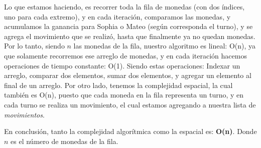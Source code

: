 Lo que estamos haciendo, es recorrer toda la fila de monedas (con dos índices, uno para cada extremo), y en cada iteración, comparamos las monedas, y acumulamos la ganancia para Sophia o Mateo (según corresponda el turno), y se agrega el movimiento que se realizó, hasta que finalmente ya no quedan monedas. Por lo tanto, siendo $n$ las monedas de la fila, nuestro algoritmo es lineal: O(n), ya que solamente recorremos ese arreglo de monedas, y en cada iteración hacemos operaciones de tiempo constante: O(1). Siendo estas operaciones: Indexar un arreglo, comparar dos elementos, sumar dos elementos, y agregar un elemento al final de un arreglo. Por otro lado, tenemos la complejidad espacial, la cual también es O(n), puesto que cada moneda en la fila representa un turno, y en cada turno se realiza un movimiento, el cual estamos agregando a nuestra lista de \textit{movimientos}.

En conclusión, tanto la complejidad algorítmica como la espacial es: \textbf{O(n)}. Donde $n$ es el número de monedas de la fila.